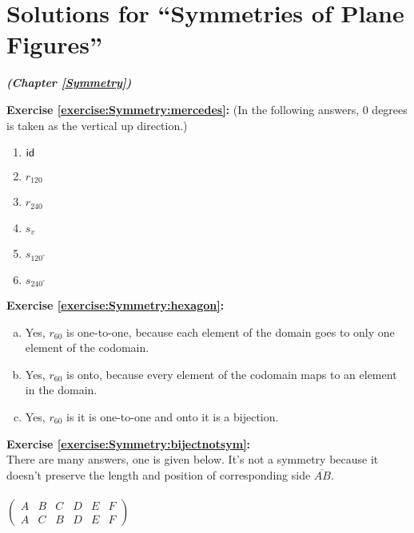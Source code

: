 \section{Solutions for  ``Symmetries of Plane Figures''}
\label{sec:AnswerKey:Symmetry}
\noindent\textbf{\textit{ (Chapter \ref{Symmetry})}}\bigskip

\noindent\textbf{Exercise \ref{exercise:Symmetry:mercedes}:}
(In the following answers, 0 degrees is taken as the vertical up direction.)
\begin{multicols}{3}
\begin{enumerate}
\item
$\sf{id}$

\item
$r_{120}$

\item
$r_{240}$

\item
$s_v$

\item
$s_{120^{\circ}}$

\item
$s_{240^{\circ}}$
\end{enumerate}
\end{multicols}

\noindent\textbf{Exercise \ref{exercise:Symmetry:hexagon}:}
\begin{enumerate}[(a)]
\item
Yes, $r_{60}$ is one-to-one, because each element of the domain goes to only one element of the codomain.

\item
Yes, $r_{60}$ is onto, because every element of the codomain maps to an element in the domain.

\item
Yes, $r_{60}$ is it is one-to-one and onto it is a bijection.
\end{enumerate}

\noindent\textbf{Exercise \ref{exercise:Symmetry:bijectnotsym}:}\\
There are many answers, one is given below.  It's not a symmetry because it doesn't preserve the length and position of corresponding side $\overline{AB}$.\\
\\
$\begin{pmatrix}
A & B & C & D & E & F\\
A & C & B & D & E & F
\end{pmatrix}$\\

